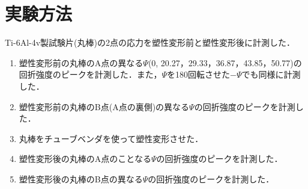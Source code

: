 \section{実験方法}
Ti-6Al-4v製試験片(丸棒)の2点の応力を塑性変形前と塑性変形後に計測した．

\begin{enumerate}
    \item 塑性変形前の丸棒のA点の異なる$\Psi$(0\textdegree, 20.27\textdegree，29.33\textdegree，36.87\textdegree，43.85\textdegree，50.77\textdegree)の回折強度のピークを計測した．また，$\Psi$を180\textdegree 回転させた$-\Psi$でも同様に計測した．
    \item 塑性変形前の丸棒のB点(A点の裏側)の異なる$\Psi$の回折強度のピークを計測した．
    \item 丸棒をチューブベンダを使って塑性変形させた．
    \item 塑性変形後の丸棒のA点のことなる$\Psi$の回折強度のピークを計測した．
    \item 塑性変形後の丸棒のB点の異なる$\Psi$の回折強度のピークを計測した．
\end{enumerate}